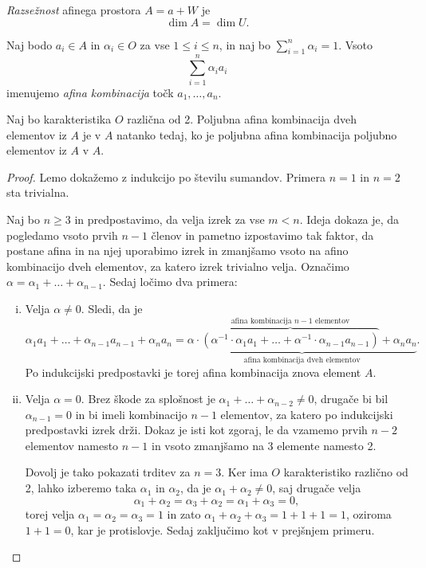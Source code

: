 \begin{definicija}
    \emph{Razsežnost} afinega prostora $A = a + W$ je 
    \[
    \dim A = \dim U.
    \]
\end{definicija}

\begin{definicija}
    Naj bodo $a_{i} \in A$ in $\alpha_{i} \in O$ za vse $1 \leq i \leq n$, in naj bo $\sum_{i=1}^{n} \alpha_{i} = 1$. Vsoto 
    \[
    \sum_{i=1}^{n} \alpha_{i} a_{i}
    \]
    imenujemo \emph{afina kombinacija} točk $a_1,\dots, a_n$.
\end{definicija}

\begin{lema}
    Naj bo karakteristika $O$ različna od 2. Poljubna afina kombinacija dveh elementov iz $A$ je v $A$ natanko tedaj, ko je poljubna afina kombinacija poljubno elementov iz $A$ v $A$.
\end{lema}

\begin{proof}
    Lemo dokažemo z indukcijo po številu sumandov. Primera $n = 1$ in $n = 2$ sta trivialna.
    
    Naj bo $n \geq 3$ in predpostavimo, da velja izrek za vse $m < n$. Ideja dokaza je, da pogledamo vsoto prvih $n - 1$ členov in pametno izpostavimo tak faktor, da postane afina in na njej uporabimo izrek
    in zmanjšamo vsoto na afino kombinacijo dveh elementov, za katero izrek trivialno velja.
    Označimo $\alpha = \alpha_1 + \dots + \alpha_{n-1}$. Sedaj ločimo dva primera:
   
    \begin{enumerate}[i)]
    \item Velja $\alpha \neq 0.$ Sledi, da je
    \[
        \alpha_1 a_1 + \dots + \alpha_{n-1} a_{n-1} + \alpha_n a_n = 
        \underbrace{\alpha \cdot \overbrace{(\alpha^{-1} \cdot \alpha_1 a_1 + \dots + \alpha^{-1} \cdot \alpha_{n-1} a_{n-1})}^{\text{afina kombinacija $n - 1$ elementov}} + \alpha_n a_n}_{\text{afina kombinacija dveh elementov}}.
    \]
    Po indukcijski predpostavki je torej afina kombinacija znova element $A$.
    \item Velja $\alpha = 0$.
    Brez škode za splošnost je $\alpha_1 + \dots + \alpha_{n-2} \neq 0$, drugače bi bil $\alpha_{n-1} = 0$ in bi imeli kombinacijo $n-1$ elementov, za katero po indukcijski predpostavki izrek drži.
    Dokaz je isti kot zgoraj, le da vzamemo prvih $n-2$ elementov namesto $n-1$ in vsoto zmanjšamo na 3 elemente namesto 2. 
    
    Dovolj je tako pokazati trditev za $n=3$. Ker ima $O$ karakteristiko različno od 2, lahko izberemo taka $\alpha_1$ in $\alpha_2$, da je $\alpha_1 + \alpha_2 \neq 0$,
    saj drugače velja
    \[
    \alpha_1 + \alpha_2 = \alpha_3 + \alpha_2 = \alpha_1 + \alpha_3 = 0,
    \]
    torej velja $\alpha_1 = \alpha_2 = \alpha_3 = 1$ in zato $\alpha_1 + \alpha_2 + \alpha_3 = 1 + 1 + 1 = 1$, oziroma $1 + 1 = 0$, kar je protislovje. Sedaj zaključimo kot v prejšnjem primeru. \qedhere
    \end{enumerate}
\end{proof}


